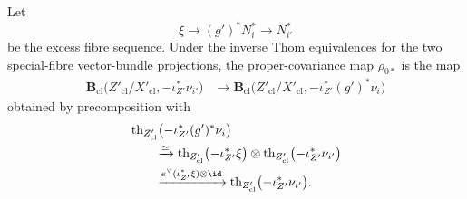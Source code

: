 \begin{lemma}
Let
\[
    \xi
    \longrightarrow
    (g')^*N_i^*
    \longrightarrow
    N_{i'}^*
\]
be the excess fibre sequence.  Under the inverse Thom equivalences for the
two special-fibre vector-bundle projections, the proper-covariance map
\(\rho_{0*}\) is the map
\[
\begin{aligned}
    \mathbf B_{\mathrm{cl}}
    \bigl(
      Z'_{\mathrm{cl}}/X'_{\mathrm{cl}},
      -\iota_{Z'}^*\nu_{i'}
    \bigr)
    &\longrightarrow
    \mathbf B_{\mathrm{cl}}
    \bigl(
      Z'_{\mathrm{cl}}/X'_{\mathrm{cl}},
      -\iota_{Z'}^*(g')^*\nu_i
    \bigr)
\end{aligned}
\]
obtained by precomposition with
\[
\begin{aligned}
    &
    \operatorname{th}_{Z'_{\mathrm{cl}}}
    \bigl(
      -\iota_{Z'}^*(g')^*\nu_i
    \bigr)
    \\
    &\qquad\xrightarrow{\simeq}
    \operatorname{th}_{Z'_{\mathrm{cl}}}
    \bigl(
      -\iota_{Z'}^*\xi
    \bigr)
    \otimes
    \operatorname{th}_{Z'_{\mathrm{cl}}}
    \bigl(
      -\iota_{Z'}^*\nu_{i'}
    \bigr)
    \\
    &\qquad\xrightarrow{
      e^\vee(\iota_{Z'}^*\xi)\otimes\id
    }
    \operatorname{th}_{Z'_{\mathrm{cl}}}
    \bigl(
      -\iota_{Z'}^*\nu_{i'}
    \bigr).
\end{aligned}
\]
\end{lemma}

